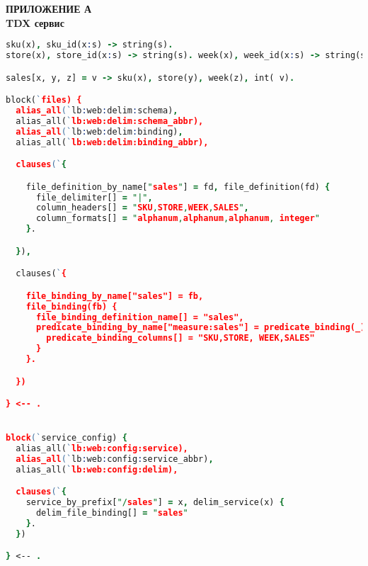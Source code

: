 \begin{center}
\textbf{
\MakeUppercase{Приложение А}\\
TDX сервис}
\end{center}

\begin{lstlisting}[language=Prolog]
sku(x), sku_id(x:s) -> string(s).
store(x), store_id(x:s) -> string(s). week(x), week_id(x:s) -> string(s).

sales[x, y, z] = v -> sku(x), store(y), week(z), int( v).

block(`files) {
  alias_all(`lb:web:delim:schema),
  alias_all(`lb:web:delim:schema_abbr),
  alias_all(`lb:web:delim:binding),
  alias_all(`lb:web:delim:binding_abbr),

  clauses(`{

    file_definition_by_name["sales"] = fd, file_definition(fd) {
      file_delimiter[] = "|",
      column_headers[] = "SKU,STORE,WEEK,SALES",
      column_formats[] = "alphanum,alphanum,alphanum, integer"
    }.

  }),

  clauses(`{

    file_binding_by_name["sales"] = fb,
    file_binding(fb) {
      file_binding_definition_name[] = "sales",
      predicate_binding_by_name["measure:sales"] = predicate_binding(_) {
        predicate_binding_columns[] = "SKU,STORE, WEEK,SALES"
      }
    }.

  })

} <-- .


block(`service_config) {
  alias_all(`lb:web:config:service),
  alias_all(`lb:web:config:service_abbr),
  alias_all(`lb:web:config:delim),

  clauses(`{
    service_by_prefix["/sales"] = x, delim_service(x) {
      delim_file_binding[] = "sales"
    }.
  })

} <-- .
\end{lstlisting}
